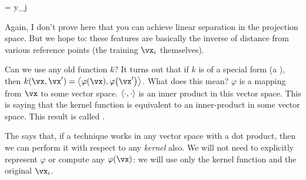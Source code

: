 \documentclass[11pt, oneside]{amsart}
\begin{document}
\begin{nedqn}
   = y_j
\end{nedqn}

Again, I don't prove here that you can achieve linear separation in the
projection space. But we hope to: these features are basically the
inverse of distance from various reference points (the training $\vx_i$
themselves).

Can we use any old function $k$? It turns out that if $k$ is of a
special form (a ), then $k(\vx, \vx') =
\iprod{\vphif{\vx}}{\vphif{\vx'}}$. What does this mean? $\varphi$ is a
mapping from $\vx$ to some vector space. $\left\langle \cdot, \cdot \right\rangle$ is an
inner product in this vector space. This is saying that the kernel
function is equivalent to an inner-product in some vector space. This
result is called .

The  says that, if a technique works in any vector
space with a dot product, then we can perform it with respect to any
\emph{kernel} also. We will not need to explicitly represent $\varphi$
or compute any $\varphi(\vx)$: we will use only the kernel function and
the original $\vx_i$.
\end{document}
